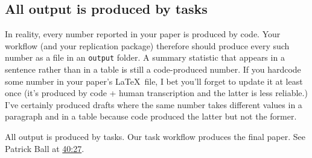 \subsection{All output is produced by tasks}

In reality, every number reported in your paper is produced by code.
Your workflow (and your replication package) therefore should produce every such number as a file in an \texttt{output} folder.
A summary statistic that appears in a sentence rather than in a table is still a code-produced number.
If you hardcode some number in your paper's \LaTeX\ file, I bet you'll forget to update it at least once (it's produced by code + human transcription and the latter is less reliable.)
I've certainly produced drafts where the same number takes different values in a paragraph and in a table because code produced the latter but not the former.

All output is produced by tasks.
Our task workflow produces the final paper.
See Patrick Ball at \href{https://www.youtube.com/watch?v=ZSunU9GQdcI&t=40m27s}{40:27}.
